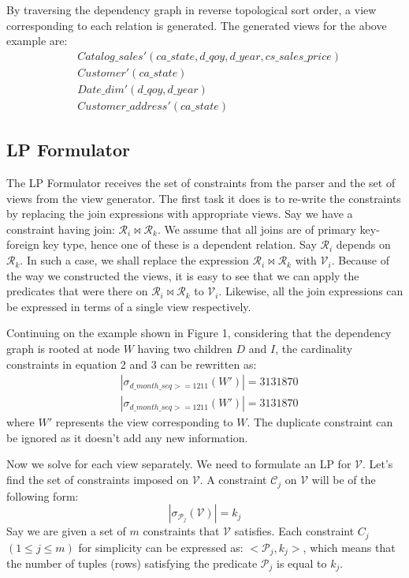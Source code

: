 \documentclass[]{article}
\begin{document}
\begin{multicols}{2}
			By traversing the dependency graph in reverse topological sort order, a view corresponding to each relation is generated. The generated views for the above example are: 
			\begin{align*}
				& Catalog\_sales' (ca\_state, d\_qoy, d\_year, cs\_sales\_price) \\
				& Customer' (ca\_state) \\
				& Date\_dim' (d\_qoy, d\_year) \\
				& Customer\_address' (ca\_state)
			\end{align*}
	
		\subsection{LP Formulator}
			The LP Formulator receives the set of constraints from the parser and the set of views from the view generator. 
			The first task it does is to re-write the constraints by replacing the join expressions with appropriate views. 
			Say we have a constraint having join: $\mathcal{R}_{i} \bowtie \mathcal{R}_{k}$. 
			We assume that all joins are of primary key-foreign key type, hence one of these is a dependent relation. 
			Say $\mathcal{R}_{i}$ depends on $\mathcal{R}_{k}$. 
			In such a case, we shall replace the expression $\mathcal{R}_{i} \bowtie \mathcal{R}_{k}$ with $\mathcal{V}_{i}$. 
			Because of the way we constructed the views, it is easy to see that we can apply the predicates that were there on  $\mathcal{R}_{i} \bowtie \mathcal{R}_{k}$ to $\mathcal{V}_{i}$. 
			Likewise, all the join expressions can be expressed in terms of a single view respectively.
			
			Continuing on the example shown in Figure 1, considering that the dependency graph is rooted at node $W$ having two children $D$ and $I$, the cardinality constraints in equation 2 and 3 can be rewritten as:
			\begin{align*}
				& |\sigma_{d\_month\_seq >= 1211}(W')| = 3131870 \\
				& |\sigma_{d\_month\_seq >= 1211}(W')| = 3131870
			\end{align*}
			where $W'$ represents the view corresponding to $W$. 
			The duplicate constraint can be ignored as it doesn't add any new information.
			
			Now we solve for each view separately. 
			We need to formulate an LP for $\mathcal{V}$. 
			Let's find the set of constraints imposed on $\mathcal{V}$. 
			A constraint $\mathcal{C}_{j}$ on $\mathcal{V}$ will be of the following form:
			\begin{equation*}
				| \sigma_{\mathcal{P}_{j}} (\mathcal{V})| = k_{j}
			\end{equation*}
			Say we are given a set of $m$ constraints that $\mathcal{V}$ satisfies. 
			Each constraint $C_{j}$  $(1 \leq j \leq m)$ for simplicity can be expressed as: $<\mathcal{P}_{j}, k_{j}>$, which means that the number of tuples (rows) satisfying the predicate $\mathcal{P}_{j}$ is equal to $k_{j}$. 
			

\end{multicols}
\end{document}
